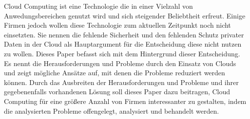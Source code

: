 Cloud Computing ist eine Technologie die in einer Vielzahl von Anwedungsbereichen genutzt wird und sich steigender Beliebtheit erfreut. Einige Firmen jedoch wollen diese Technologie zum aktuellen Zeitpunkt noch nicht einsetzten. Sie nennen die fehlende Sicherheit und den fehlenden Schutz privater Daten in der Cloud als Hauptargument für die Entscheidung diese nicht nutzen zu wollen. Dieses Paper befasst sich mit dem Hintergrund dieser Entscheidung. Es nennt die Herausforderungen und Probleme durch den Einsatz von Clouds und zeigt mögliche Ansätze auf, mit denen die Probleme reduziert werden können. Durch das Ausbreiten der Herausforderungen und Probleme und ihrer gegebenenfalls vorhandenen Lösung soll dieses Paper dazu beitragen, Cloud Computing für eine größere Anzahl von Firmen interessanter zu gestalten, indem die analysierten Probleme offengelegt, analysiert und behandelt werden.
